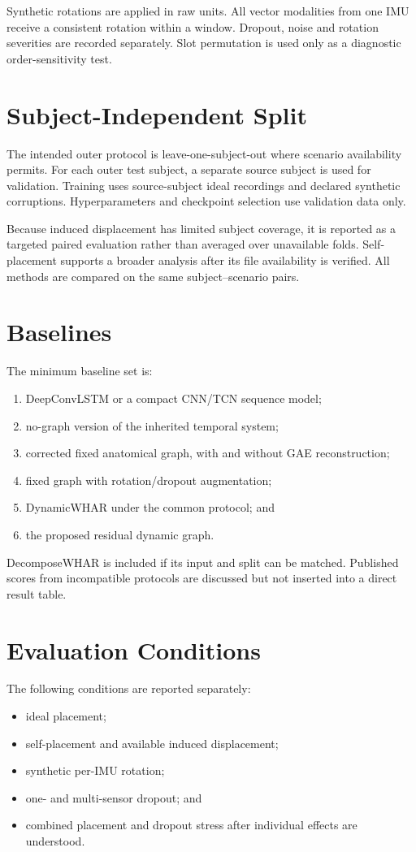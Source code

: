\documentclass[12pt,a4paper,twoside,openright]{report}
\begin{document}
Synthetic rotations are applied in raw units. All vector modalities from one IMU receive a consistent rotation within a window. Dropout, noise and rotation severities are recorded separately. Slot permutation is used only as a diagnostic order-sensitivity test.

\section{Subject-Independent Split}
The intended outer protocol is leave-one-subject-out where scenario availability permits. For each outer test subject, a separate source subject is used for validation. Training uses source-subject ideal recordings and declared synthetic corruptions. Hyperparameters and checkpoint selection use validation data only.

Because induced displacement has limited subject coverage, it is reported as a targeted paired evaluation rather than averaged over unavailable folds. Self-placement supports a broader analysis after its file availability is verified. All methods are compared on the same subject--scenario pairs.

\section{Baselines}
The minimum baseline set is:
\begin{enumerate}
\item DeepConvLSTM or a compact CNN/TCN sequence model;
\item no-graph version of the inherited temporal system;
\item corrected fixed anatomical graph, with and without GAE reconstruction;
\item fixed graph with rotation/dropout augmentation;
\item DynamicWHAR under the common protocol; and
\item the proposed residual dynamic graph.
\end{enumerate}
DecomposeWHAR is included if its input and split can be matched. Published scores from incompatible protocols are discussed but not inserted into a direct result table.

\section{Evaluation Conditions}
The following conditions are reported separately:
\begin{itemize}
\item ideal placement;
\item self-placement and available induced displacement;
\item synthetic per-IMU rotation;
\item one- and multi-sensor dropout; and
\item combined placement and dropout stress after individual effects are understood.
\end{itemize}
\end{document}
